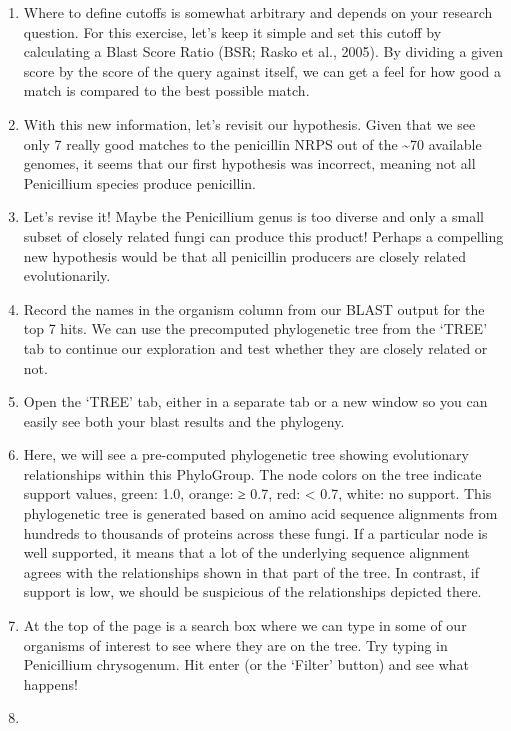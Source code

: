 \documentclass[
  letterpaper,
  DIV=11,
  numbers=noendperiod]{scrreprt}
\begin{document}
\begin{enumerate}
  Can you find where hit quality begins to drop off? You can see by just
  looking at the top 10 that quality drops off really fast!
\item
  Where to define cutoffs is somewhat arbitrary and depends on your
  research question. For this exercise, let's keep it simple and set
  this cutoff by calculating a Blast Score Ratio (BSR; Rasko et al.,
  2005). By dividing a given score by the score of the query against
  itself, we can get a feel for how good a match is compared to the best
  possible match.
\item
  With this new information, let's revisit our hypothesis. Given that we
  see only 7 really good matches to the penicillin NRPS out of the
  \textasciitilde70 available genomes, it seems that our first
  hypothesis was incorrect, meaning not all Penicillium species produce
  penicillin.
\item
  Let's revise it! Maybe the Penicillium genus is too diverse and only a
  small subset of closely related fungi can produce this product!
  Perhaps a compelling new hypothesis would be that all penicillin
  producers are closely related evolutionarily.
\item
  Record the names in the organism column from our BLAST output for the
  top 7 hits. We can use the precomputed phylogenetic tree from the
  `TREE' tab to continue our exploration and test whether they are
  closely related or not.
\item
  Open the `TREE' tab, either in a separate tab or a new window so you
  can easily see both your blast results and the phylogeny.
\item
  Here, we will see a pre-computed phylogenetic tree showing
  evolutionary relationships within this PhyloGroup. The node colors on
  the tree indicate support values, green: 1.0, orange: ≥ 0.7, red:
  \textless{} 0.7, white: no support. This phylogenetic tree is
  generated based on amino acid sequence alignments from hundreds to
  thousands of proteins across these fungi. If a particular node is well
  supported, it means that a lot of the underlying sequence alignment
  agrees with the relationships shown in that part of the tree. In
  contrast, if support is low, we should be suspicious of the
  relationships depicted there.
\item
  At the top of the page is a search box where we can type in some of
  our organisms of interest to see where they are on the tree. Try
  typing in Penicillium chrysogenum. Hit enter (or the `Filter' button)
  and see what happens!
\item

\end{enumerate}
\end{document}

